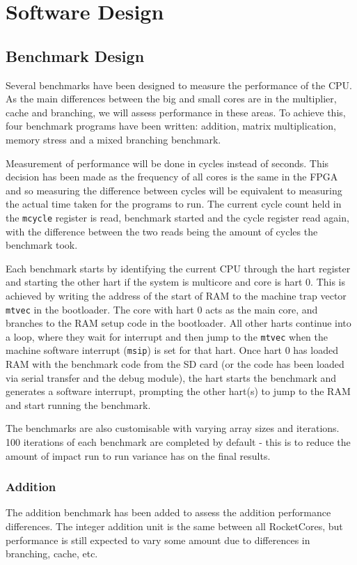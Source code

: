 \chapter{Software Design}
\label{ch:software_design}
\section{Benchmark Design}
Several benchmarks have been designed to measure the performance of the CPU. As the main differences between the big and small cores are in the multiplier, cache and branching, we will assess performance in these areas. To achieve this, four benchmark programs have been written: addition, matrix multiplication, memory stress and a mixed branching benchmark.

Measurement of performance will be done in cycles instead of seconds. This decision has been made as the frequency of all cores is the same in the FPGA and so measuring the difference between cycles will be equivalent to measuring the actual time taken for the programs to run. The current cycle count held in the \texttt{mcycle} register is read, benchmark started and the cycle register read again, with the difference between the two reads being the amount of cycles the benchmark took.

Each benchmark starts by identifying the current CPU through the hart register and starting the other hart if the system is multicore and core is hart 0. This is achieved by writing the address of the start of RAM to the machine trap vector \texttt{mtvec} in the bootloader. The core with hart 0 acts as the main core, and branches to the RAM setup code in the bootloader. All other harts continue into a loop, where they wait for interrupt and then jump to the \texttt{mtvec} when the machine software interrupt (\texttt{msip}) is set for that hart. Once hart 0 has loaded RAM with the benchmark code from the SD card (or the code has been loaded via serial transfer and the debug module), the hart starts the benchmark and generates a software interrupt, prompting the other hart(s) to jump to the RAM and start running the benchmark.

The benchmarks are also customisable with varying array sizes and iterations. 100 iterations of each benchmark are completed by default - this is to reduce the amount of impact run to run variance has on the final results.

\subsection{Addition}
The addition benchmark has been added to assess the addition performance differences. The integer addition unit is the same between all RocketCores, but performance is still expected to vary some amount due to differences in branching, cache, etc. 

